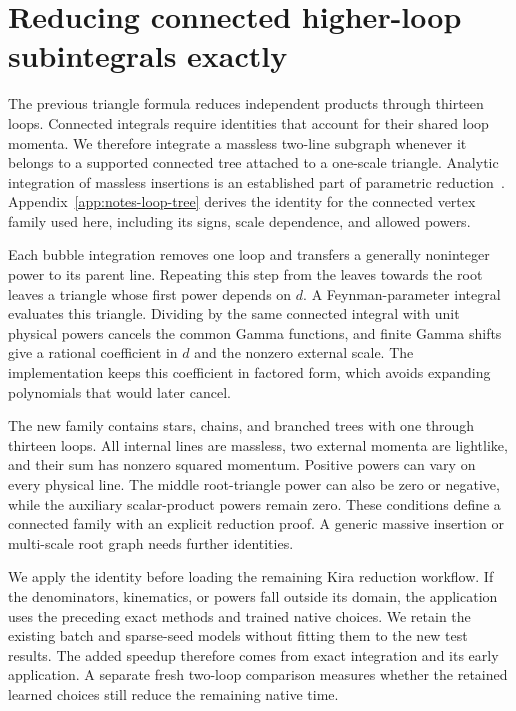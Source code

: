 \section{Reducing connected higher-loop subintegrals exactly}
\label{sec:notes-loop-tree-method}
The previous triangle formula reduces independent products through thirteen loops. Connected integrals require identities that account for their shared loop momenta. We therefore integrate a massless two-line subgraph whenever it belongs to a supported connected tree attached to a one-scale triangle. Analytic integration of massless insertions is an established part of parametric reduction~\cite{Ruijl2017Forcer}. Appendix~\ref{app:notes-loop-tree} derives the identity for the connected vertex family used here, including its signs, scale dependence, and allowed powers.

Each bubble integration removes one loop and transfers a generally noninteger power to its parent line. Repeating this step from the leaves towards the root leaves a triangle whose first power depends on $d$. A Feynman-parameter integral evaluates this triangle. Dividing by the same connected integral with unit physical powers cancels the common Gamma functions, and finite Gamma shifts give a rational coefficient in $d$ and the nonzero external scale. The implementation keeps this coefficient in factored form, which avoids expanding polynomials that would later cancel.

The new family contains stars, chains, and branched trees with one through thirteen loops. All internal lines are massless, two external momenta are lightlike, and their sum has nonzero squared momentum. Positive powers can vary on every physical line. The middle root-triangle power can also be zero or negative, while the auxiliary scalar-product powers remain zero. These conditions define a connected family with an explicit reduction proof. A generic massive insertion or multi-scale root graph needs further identities.

We apply the identity before loading the remaining Kira reduction workflow. If the denominators, kinematics, or powers fall outside its domain, the application uses the preceding exact methods and trained native choices. We retain the existing batch and sparse-seed models without fitting them to the new test results. The added speedup therefore comes from exact integration and its early application. A separate fresh two-loop comparison measures whether the retained learned choices still reduce the remaining native time.
